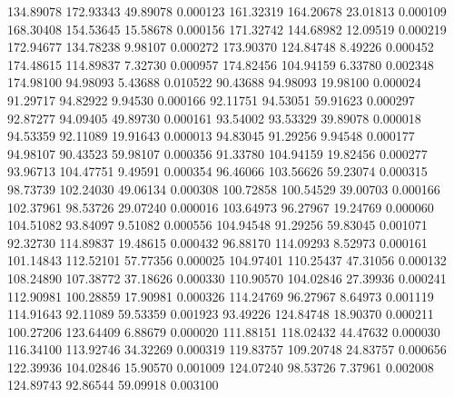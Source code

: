       134.89078      172.93343       49.89078       0.000123
      161.32319      164.20678       23.01813       0.000109
      168.30408      154.53645       15.58678       0.000156
      171.32742      144.68982       12.09519       0.000219
      172.94677      134.78238        9.98107       0.000272
      173.90370      124.84748        8.49226       0.000452
      174.48615      114.89837        7.32730       0.000957
      174.82456      104.94159        6.33780       0.002348
      174.98100       94.98093        5.43688       0.010522
       90.43688       94.98093       19.98100       0.000024
       91.29717       94.82922        9.94530       0.000166
       92.11751       94.53051       59.91623       0.000297
       92.87277       94.09405       49.89730       0.000161
       93.54002       93.53329       39.89078       0.000018
       94.53359       92.11089       19.91643       0.000013
       94.83045       91.29256        9.94548       0.000177
       94.98107       90.43523       59.98107       0.000356
       91.33780      104.94159       19.82456       0.000277
       93.96713      104.47751        9.49591       0.000354
       96.46066      103.56626       59.23074       0.000315
       98.73739      102.24030       49.06134       0.000308
      100.72858      100.54529       39.00703       0.000166
      102.37961       98.53726       29.07240       0.000016
      103.64973       96.27967       19.24769       0.000060
      104.51082       93.84097        9.51082       0.000556
      104.94548       91.29256       59.83045       0.001071
       92.32730      114.89837       19.48615       0.000432
       96.88170      114.09293        8.52973       0.000161
      101.14843      112.52101       57.77356       0.000025
      104.97401      110.25437       47.31056       0.000132
      108.24890      107.38772       37.18626       0.000330
      110.90570      104.02846       27.39936       0.000241
      112.90981      100.28859       17.90981       0.000326
      114.24769       96.27967        8.64973       0.001119
      114.91643       92.11089       59.53359       0.001923
       93.49226      124.84748       18.90370       0.000211
      100.27206      123.64409        6.88679       0.000020
      111.88151      118.02432       44.47632       0.000030
      116.34100      113.92746       34.32269       0.000319
      119.83757      109.20748       24.83757       0.000656
      122.39936      104.02846       15.90570       0.001009
      124.07240       98.53726        7.37961       0.002008
      124.89743       92.86544       59.09918       0.003100
